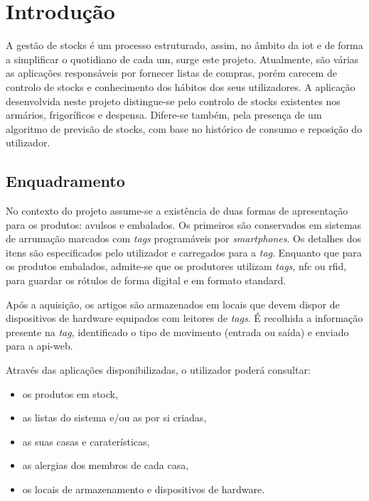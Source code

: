 %
%
\chapter{Introdução} \label{cap1}

A gestão de stocks é um processo estruturado, assim, no âmbito da \acrfull{iot} e de forma a simplificar o quotidiano de cada um, surge este projeto. Atualmente, são várias as aplicações responsáveis por fornecer listas de compras, porém carecem de controlo de stocks e conhecimento dos hábitos dos seus utilizadores. A aplicação desenvolvida neste projeto distingue-se pelo controlo de stocks existentes nos armários, frigoríficos e despensa. Difere-se também, pela presença de um algoritmo de previsão de stocks, com base no histórico de consumo e reposição do utilizador.

%
%
\section{Enquadramento} \label{sec11}

No contexto do projeto assume-se a existência de duas formas de apresentação para os produtos: avulsos e embalados. Os primeiros são conservados em sistemas de arrumação marcados com \textit{tags} programáveis por \textit{smartphones}. Os detalhes dos itens são especificados pelo utilizador e carregados para a \textit{tag}. Enquanto que para os produtos embalados, admite-se que os produtores utilizam \textit{tags}, \acrfull{nfc} ou \acrfull{rfid}, para guardar os rótulos de forma digital e em formato standard.

Após a aquisição, os artigos são armazenados em locais que devem dispor de dispositivos de hardware equipados com leitores de \textit{tags}. É recolhida a informação presente na \textit{tag}, identificado o tipo de movimento (entrada ou saída) e enviado para a \gls{api-web}. 

Através das aplicações disponibilizadas, o utilizador poderá consultar:
\begin{itemize} \itemsep 0pt
	\item os produtos em stock,
	\item as listas do sistema e/ou as por si criadas,
	\item as suas casas e caraterísticas,
	\item as alergias dos membros de cada casa,
	\item os locais de armazenamento e dispositivos de hardware.
\end{itemize}

